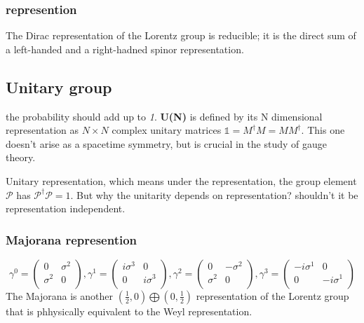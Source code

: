 \subsubsection{represention}
The Dirac representation of the Lorentz group is reducible; it is the direct
sum of a left-handed and a right-hadned spinor representation.

\subsection{Unitary group} 
the probability should add up to \emph{1}.
\textbf{U(N)} is defined by its N dimensional representation as $N\times N$
complex unitary matrices $\mathds{1} = M^{\dag}M = MM^{\dag}$. This one
doesn't arise as a spacetime symmetry, but is crucial in the study of gauge
theory. 

Unitary representation, which means under the representation, the group
element $\mathcal{P}$ has $\mathcal{P}^\dag\mathcal{P}=1$. But why the
unitarity depends on representation? shouldn't it be representation
independent.

\subsubsection{Majorana represention}
\begin{equation}
    \gamma^{0} = 
    \begin{pmatrix}
	0   &	\sigma^2    \\
	\sigma^2    & 0     \\
    \end{pmatrix},
    \gamma^{1} = 
    \begin{pmatrix}
	i\sigma^3    & 0     \\
	0   &	i\sigma^3    \\
    \end{pmatrix},
    \gamma^{2} = 
    \begin{pmatrix}
	0   &	-\sigma^2    \\
	\sigma^2    & 0     \\
    \end{pmatrix},
    \gamma^{3} = 
    \begin{pmatrix}
	-i\sigma^1    & 0     \\
	0   &	-i\sigma^1    \\
    \end{pmatrix}
\end{equation}
The Majorana is another $(\frac{1}{2}, 0)\bigoplus (0, \frac{1}{2})$
representation of the Lorentz group that is phhysically equivalent to the
Weyl representation.
